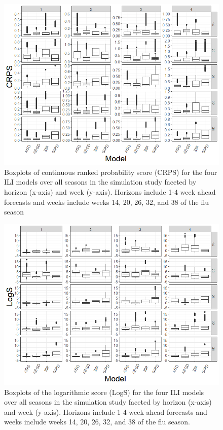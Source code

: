 \documentclass[ba]{imsart}
\theoremstyle{plain}
\theoremstyle{definition}
\theoremstyle{remark}
\begin{document}
\begin{figure}
    \centering
    \includegraphics[scale=.4]{Images/crps_by_week_horizon.png}
    \caption{Boxplots of continuous ranked probability score (CRPS) for the four ILI models over all seasons in the simulation study faceted by horizon (x-axis) and week (y-axis). Horizons include 1-4 week ahead forecasts and weeks include weeks 14, 20, 26, 32, and 38 of the flu season}
    \label{fig:crps_by_week_horizon}
\end{figure}



\begin{figure}
    \centering
    \includegraphics[scale=.4]{Images/logs_by_week_horizon.png}
    \caption{Boxplots of the logarithmic score (LogS) for the four ILI models over all seasons in the simulation study faceted by horizon (x-axis) and week (y-axis). Horizons include 1-4 week ahead forecasts and weeks include weeks 14, 20, 26, 32, and 38 of the flu season.}
    \label{fig:logs_by_week_horizon}
\end{figure}
\end{document}
